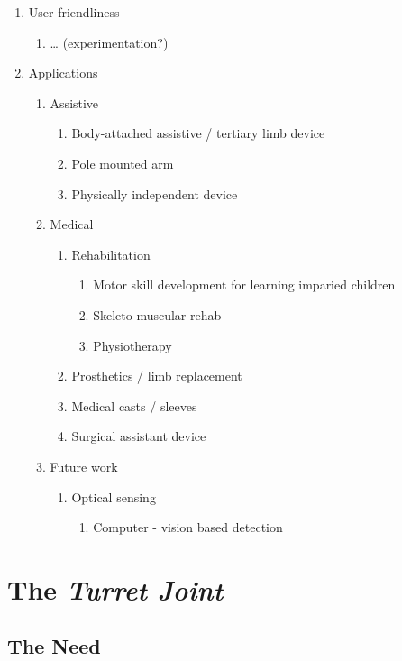 \documentclass[11pt]{article}
\begin{document}
\begin{enumerate}
\item User-friendliness
  \begin{enumerate}
  \item … (experimentation?)
  \end{enumerate}
\item Applications
  \begin{enumerate}
  \item Assistive
    \begin{enumerate}
    \item Body-attached assistive / tertiary limb device
    \item Pole mounted arm
    \item Physically independent device
    \end{enumerate}
  \item Medical
    \begin{enumerate}
    \item Rehabilitation
      \begin{enumerate}
      \item Motor skill development for learning imparied children
      \item Skeleto-muscular rehab
      \item Physiotherapy
      \end{enumerate}
    \item Prosthetics / limb replacement
    \item Medical casts / sleeves
    \item Surgical assistant device
    \end{enumerate}
  \item Future work
    \begin{enumerate}
    \item Optical sensing
      \begin{enumerate}
      \item Computer - vision based detection
      \end{enumerate}
    \end{enumerate}
  \end{enumerate}
\end{enumerate}

\section{The \textit{Turret Joint}}

\subsection{The Need}
\end{document}
